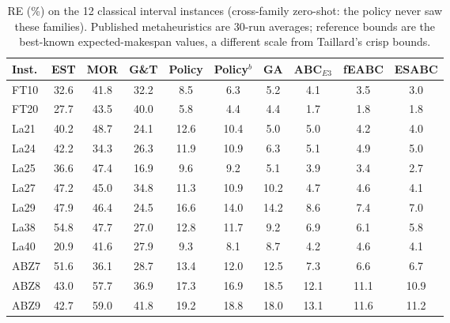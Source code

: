 \begin{table}[t]
\centering\small
\caption{RE (\%) on the 12 classical interval instances
(cross-family zero-shot: the policy never saw these families).
Published metaheuristics are 30-run averages; reference bounds
are the best-known expected-makespan values, a different scale
from Taillard's crisp bounds.}
\label{tab:classics}
\begin{tabular}{lccccccccc}
\toprule
Inst. & EST & MOR & G\&T & Policy & Policy$^{b}$ & GA & ABC$_{E3}$ & fEABC & ESABC \\
\midrule
FT10 & 32.6 & 41.8 & 32.2 & 8.5 & 6.3 & 5.2 & 4.1 & 3.5 & 3.0 \\
FT20 & 27.7 & 43.5 & 40.0 & 5.8 & 4.4 & 4.4 & 1.7 & 1.8 & 1.8 \\
La21 & 40.2 & 48.7 & 24.1 & 12.6 & 10.4 & 5.0 & 5.0 & 4.2 & 4.0 \\
La24 & 42.2 & 34.3 & 26.3 & 11.9 & 10.9 & 6.3 & 5.1 & 4.9 & 5.0 \\
La25 & 36.6 & 47.4 & 16.9 & 9.6 & 9.2 & 5.1 & 3.9 & 3.4 & 2.7 \\
La27 & 47.2 & 45.0 & 34.8 & 11.3 & 10.9 & 10.2 & 4.7 & 4.6 & 4.1 \\
La29 & 47.9 & 46.4 & 24.5 & 16.6 & 14.0 & 14.2 & 8.6 & 7.4 & 7.0 \\
La38 & 54.8 & 47.7 & 27.0 & 12.8 & 11.7 & 9.2 & 6.9 & 6.1 & 5.8 \\
La40 & 20.9 & 41.6 & 27.9 & 9.3 & 8.1 & 8.7 & 4.2 & 4.6 & 4.1 \\
ABZ7 & 51.6 & 36.1 & 28.7 & 13.4 & 12.0 & 12.5 & 7.3 & 6.6 & 6.7 \\
ABZ8 & 43.0 & 57.7 & 36.9 & 17.3 & 16.9 & 18.5 & 12.1 & 11.1 & 10.9 \\
ABZ9 & 42.7 & 59.0 & 41.8 & 19.2 & 18.8 & 18.0 & 13.1 & 11.6 & 11.2 \\
\bottomrule
\end{tabular}
\end{table}

